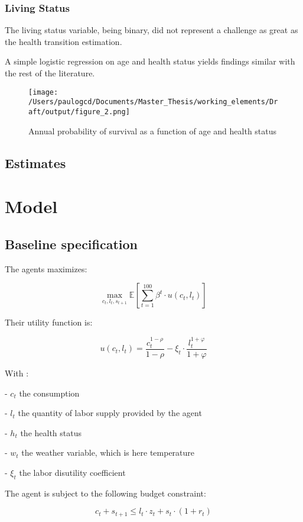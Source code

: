\documentclass{article}
\begin{document}
\subsubsection{Living Status}

The living status variable, being binary, did not represent a challenge
as great as the health transition estimation.

A simple logistic regression on age and health status yields findings similar with the
rest of the literature. 

\begin{figure}[H]
    \texttt{[image: /Users/paulogcd/Documents/Master\_Thesis/working\_elements/Draft/output/figure\_2.png]}
    \caption{Annual probability of survival as a function of age and health status}
\end{figure}


\subsection{Estimates}

\section{Model}

\subsection{Baseline specification }

The agents maximizes: 

$$ \max_{c_{t},l_{t},s_{t+1}}{\mathbb{E}\left[\sum_{t=1}^{100} \beta^{t}\cdot u(c_t,l_t)\right]}$$

Their utility function is: 

$$u(c_{t},l_{t}) = \frac{c_{t}^{1-\rho}}{1-\rho}-\xi_{t}\cdot \frac{l_{t}^{1+\varphi}}{1+\varphi}$$

With : 

-  $c_{t}$  the consumption

-  $l_{t}$  the quantity of labor supply provided by the agent

-  $h_{t}$  the health status

-  $w_{t}$  the weather variable, which is here temperature

-  $\xi_{t}$ the labor disutility coefficient

The agent is subject to the following budget constraint:

$$c_{t} + s_{t+1} \leq l_{t}\cdot z_{t} + s_{t}\cdot(1+r_{t})$$
\end{document}

